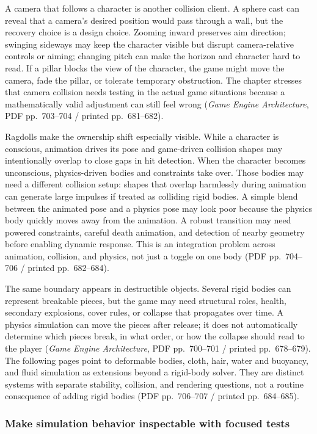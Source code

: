 A camera that follows a character is another collision client. A sphere cast can reveal that a camera's desired position would pass through a wall, but the recovery choice is a design choice. Zooming inward preserves aim direction; swinging sideways may keep the character visible but disrupt camera-relative controls or aiming; changing pitch can make the horizon and character hard to read. If a pillar blocks the view of the character, the game might move the camera, fade the pillar, or tolerate temporary obstruction. The chapter stresses that camera collision needs testing in the actual game situations because a mathematically valid adjustment can still feel wrong (\emph{Game Engine Architecture}, PDF pp.~703--704 / printed pp.~681--682).

Ragdolls make the ownership shift especially visible. While a character is conscious, animation drives its pose and game-driven collision shapes may intentionally overlap to close gaps in hit detection. When the character becomes unconscious, physics-driven bodies and constraints take over. Those bodies may need a different collision setup: shapes that overlap harmlessly during animation can generate large impulses if treated as colliding rigid bodies. A simple blend between the animated pose and a physics pose may look poor because the physics body quickly moves away from the animation. A robust transition may need powered constraints, careful death animation, and detection of nearby geometry before enabling dynamic response. This is an integration problem across animation, collision, and physics, not just a toggle on one body (PDF pp.~704--706 / printed pp.~682--684).

The same boundary appears in destructible objects. Several rigid bodies can represent breakable pieces, but the game may need structural roles, health, secondary explosions, cover rules, or collapse that propagates over time. A physics simulation can move the pieces after release; it does not automatically determine which pieces break, in what order, or how the collapse should read to the player (\emph{Game Engine Architecture}, PDF pp.~700--701 / printed pp.~678--679). The following pages point to deformable bodies, cloth, hair, water and buoyancy, and fluid simulation as extensions beyond a rigid-body solver. They are distinct systems with separate stability, collision, and rendering questions, not a routine consequence of adding rigid bodies (PDF pp.~706--707 / printed pp.~684--685).

\subsubsection{Make simulation behavior inspectable with focused tests}\label{make-simulation-behavior-inspectable-with-focused-tests}

